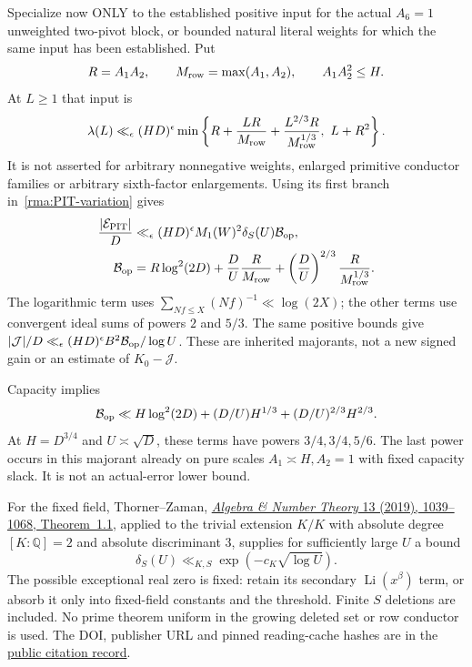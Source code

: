 \documentclass[11pt]{article}
\theoremstyle{definition}\newtheorem{definition}[theorem]{Definition}
\theoremstyle{remark}\newtheorem{remark}[theorem]{Remark}
\begin{document}
Specialize now ONLY to the established positive input for the actual $A_6=1$
unweighted two-pivot block, or bounded natural literal weights for which
the same input has been established. Put
\[
 R=A_1A_2,\qquad M_{\rm row}=\max(A_1,A_2),\qquad A_1A_2^2\le H.
\]
At $L\ge1$ that input is
\begin{equation}\label{rma:positive-input}
 \lambda(L)\ll_\epsilon(HD)^\epsilon
 \min\left\{R+\frac{LR}{M_{\rm row}}
       +\frac{L^{2/3}R}{M_{\rm row}^{1/3}},\ L+R^2\right\}.
\end{equation}
It is not asserted for arbitrary nonnegative weights, enlarged primitive
conductor families or arbitrary sixth-factor enlargements. Using its
first branch in~\eqref{rma:PIT-variation} gives
\begin{align}
 \frac{|\mathcal E_{\rm PIT}|}{D}
 &\ll_\epsilon(HD)^\epsilon M_1(W)^2\delta_S(U)\mathcal B_{\rm op},
                  \label{rma:PIT-budget}\\
 \mathcal B_{\rm op}
 &=R\log^2(2D)+\frac{D}{U}\frac{R}{M_{\rm row}}
       +\left(\frac{D}{U}\right)^{2/3}
                              \frac{R}{M_{\rm row}^{1/3}}.
                  \label{rma:Bop}
\end{align}
The logarithmic term uses $\sum_{Nf\le X}(Nf)^{-1}\ll\log(2X)$;
the other terms use convergent ideal sums of powers $2$ and $5/3$.
The same positive bounds give
$|\mathcal J|/D\ll_\epsilon(HD)^\epsilon B^2
\mathcal B_{\rm op}/\log U$. These are inherited majorants, not a new
signed gain or an estimate of $K_0-\mathcal J$.

Capacity implies
\[
 \mathcal B_{\rm op}\ll H\log^2(2D)
       +(D/U)H^{1/3}+(D/U)^{2/3}H^{2/3}.
\]
At $H=D^{3/4}$ and $U\asymp\sqrt D$, these terms have powers
$3/4,3/4,5/6$. The last power occurs in this majorant already on pure
scales $A_1\asymp H,A_2=1$ with fixed capacity slack. It is not an
actual-error lower bound.

For the fixed field, Thorner--Zaman,
\href{https://doi.org/10.2140/ant.2019.13.1039}{\emph{Algebra \& Number Theory}
13 (2019), 1039--1068, Theorem~1.1}, applied to the trivial extension
$K/K$ with absolute degree $[K:\mathbb Q]=2$ and absolute discriminant $3$, supplies for sufficiently
large $U$ a bound
\[
 \delta_S(U)\ll_{K,S}\exp(-c_K\sqrt{\log U}).
\]
The possible exceptional real zero is fixed: retain its secondary
$\operatorname{Li}(x^\beta)$ term, or absorb it only into fixed-field
constants and the threshold. Finite $S$ deletions are included. No
prime theorem uniform in the growing deleted set or row conductor is
used. The DOI, publisher URL and pinned reading-cache hashes are in the
\href{https://github.com/amelie-iska/GRH-research/blob/main/outputs/checks/2026-11-05-rough-mask/main-attempt/PUBLIC-CITATION-v1.json}{public citation record}.
\end{document}
